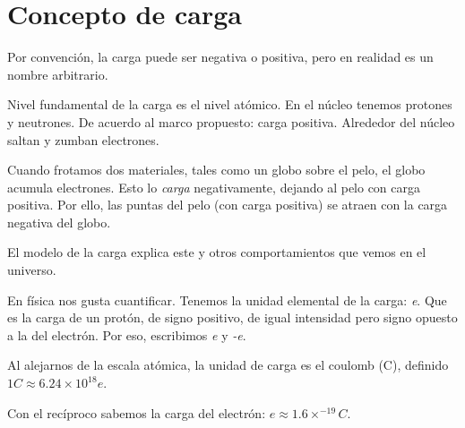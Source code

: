 \section{Concepto de carga}

Por convención,
la carga puede ser negativa o positiva,
pero en realidad es un nombre arbitrario.

Nivel fundamental de la carga es el nivel atómico.
En el núcleo tenemos protones y neutrones.
De acuerdo al marco propuesto: carga positiva.
Alrededor del núcleo saltan y zumban electrones.

Cuando frotamos dos materiales,
tales como un globo sobre el pelo,
el globo acumula electrones.
Esto lo \textit{carga} negativamente,
dejando al pelo con carga positiva.
Por ello,
las puntas del pelo (con carga positiva) se atraen con la carga negativa del globo.

El modelo de la carga explica este y otros comportamientos que vemos en el universo.

En física nos gusta cuantificar.
Tenemos la unidad elemental de la carga: \textit{e}.
Que es la carga de un protón,
de signo positivo,
de igual intensidad pero signo opuesto a la del electrón.
Por eso,
escribimos \textit{e} y \textit{-e}.

Al alejarnos de la escala atómica, 
la unidad de carga es el coulomb (C),
definido \(1 C \approx 6.24 \times 10^{18} e\).

Con el recíproco sabemos la carga del electrón: \(e \approx 1.6 \times^{-19} C\).